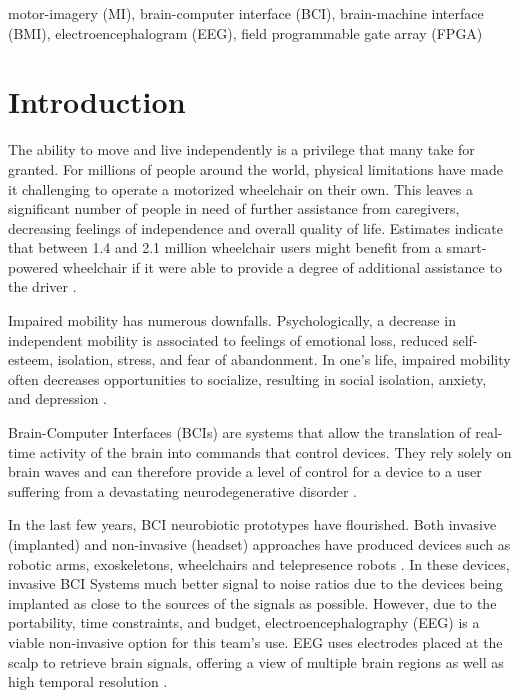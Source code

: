 \documentclass[conference]{IEEEtran}
\begin{document}
\begin{IEEEkeywords}
motor-imagery (MI), brain-computer interface (BCI), brain-machine interface (BMI), electroencephalogram (EEG), field programmable gate array (FPGA)
\end{IEEEkeywords}
\renewcommand{\thesubsection}{\Roman{section}.\Alph{subsection}}
\section{Introduction}
    The ability to move and live independently is a privilege that many take for granted. For millions of people around the world, physical limitations have made it challenging to operate a motorized wheelchair on their own. This leaves a significant number of people in need of further assistance from caregivers, decreasing feelings of independence and overall quality of life. Estimates indicate that between 1.4 and 2.1 million wheelchair users might benefit from a smart-powered wheelchair if it were able to provide a degree of additional assistance to the driver \cite{smart_wheelchairs}.  
    
    Impaired mobility has numerous downfalls. Psychologically, a decrease in independent mobility is associated to feelings of emotional loss, reduced self-esteem, isolation, stress, and fear of abandonment. In one's life, impaired mobility often decreases opportunities to socialize, resulting in social isolation, anxiety, and depression \cite{how_many_people}.
    
    Brain-Computer Interfaces (BCIs) are systems that allow the translation of real-time activity of the brain into commands that control devices. They rely solely on brain waves and can therefore provide a level of control for a device to a user suffering from a devastating neurodegenerative disorder \cite{noninvasive_brain}.

    In the last few years, BCI neurobiotic prototypes have flourished. Both invasive (implanted) and non-invasive (headset) approaches have produced devices such as robotic arms, exoskeletons, wheelchairs and telepresence robots \cite{learning_to_control}. In these devices, invasive BCI Systems much better signal to noise ratios due to the devices being implanted as close to the sources of the signals as possible. However, due to the portability, time constraints, and budget, electroencephalography (EEG) is a viable non-invasive option for this team's use. EEG uses electrodes placed at the scalp to retrieve brain signals, offering a view of multiple brain regions as well as high temporal resolution \cite{toward_brain_computer}.
    
\end{document}
